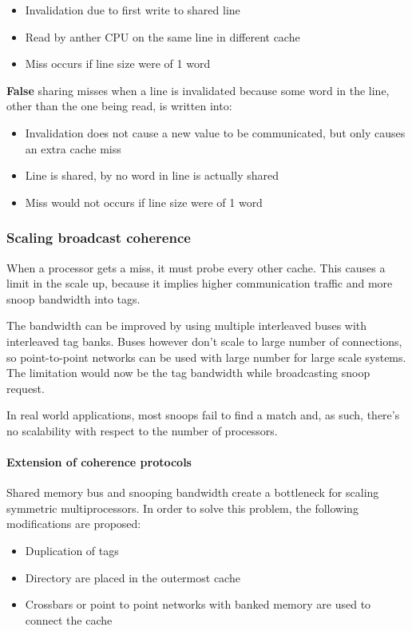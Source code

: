 \documentclass[english]{article}
\begin{document}
\begin{itemize}
  \item Invalidation due to first write to shared line
  \item Read by anther CPU on the same line in different cache
  \item Miss occurs if line size were of 1 word
\end{itemize}

\textbf{False} sharing misses when a line is invalidated because some word in the line, other than the one being read, is written into:

\begin{itemize}
  \item Invalidation does not cause a new value to be communicated, but only causes an extra cache miss
  \item Line is shared, by no word in line is actually shared
  \item Miss would not occurs if line size were of 1 word
\end{itemize}

\subsubsection{Scaling broadcast coherence}

When a processor gets a miss, it must probe every other cache.
This causes a limit in the scale up, because it implies higher communication traffic and more snoop bandwidth into tags.

The bandwidth can be improved by using multiple interleaved buses with interleaved tag banks.
Buses however don't scale to large number of connections, so point-to-point networks can be used with large number for large scale systems.
The limitation would now be the tag bandwidth while broadcasting snoop request.

In real world applications, most snoops fail to find a match and, as such, there's no scalability with respect to the number of processors.

\paragraph{Extension of coherence protocols}

Shared memory bus and snooping bandwidth create a bottleneck for scaling symmetric multiprocessors.
In order to solve this problem, the following modifications are proposed:

\begin{itemize}
  \item Duplication of tags
  \item Directory are placed in the outermost cache
  \item Crossbars or point to point networks with banked memory are used to connect the cache
\end{itemize}
\end{document}

